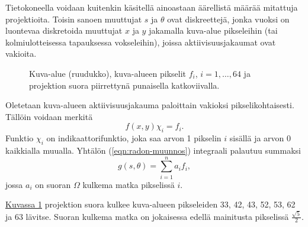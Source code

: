 Tietokoneella voidaan kuitenkin käsitellä ainoastaan äärellistä määrää mitattuja projektioita. Toisin sanoen muuttujat $s$ ja $\theta$ ovat diskreettejä, jonka vuoksi on luontevaa diskretoida muuttujat $x$ ja $y$ jakamalla kuva-alue pikseleihin (tai kolmiulotteisessa tapauksessa vokseleihin), joissa aktiivisuusjakaumat ovat vakioita.

\begin{figure}[H]
    \centering
    \captionsetup{width=.9\textwidth}
    
    \caption{Kuva-alue (ruudukko), kuva-alueen pikselit $f_i$, $i=1,\ldots,64$ ja projektion suora piirrettynä punaisella katkoviivalla.}
    \label{fig:diskreetti-projektio}
\end{figure}

%

Oletetaan kuva-alueen aktiivisuusjakauma paloittain vakioksi pikselikohtaisesti. Tällöin voidaan merkitä
\begin{equation*}
    f(x, y)\chi_{i}=f_i.
\end{equation*}
Funktio $\chi_i$ on indikaattorifunktio, joka saa arvon 1 pikselin $i$ sisällä ja arvon 0 kaikkialla muualla. Yhtälön (\ref{eqn:radon-muunnos}) integraali palautuu summaksi
\begin{equation}\label{eqn:diskreetti-radon-muunnos}
    g(s, \theta)=\sum_{i=1}^{n}a_{i}f_{i},
\end{equation}
jossa $a_i$ on suoran $\Omega$ kulkema matka pikselissä $i$. 

\hyperref[fig:diskreetti-projektio]{Kuvassa \ref*{fig:diskreetti-projektio}} projektion suora kulkee kuva-alueen pikseleiden 33, 42, 43, 52, 53, 62 ja 63 lävitse. Suoran kulkema matka on jokaisessa edellä mainitusta pikselissä $\frac{\sqrt{5}}{2}$.


